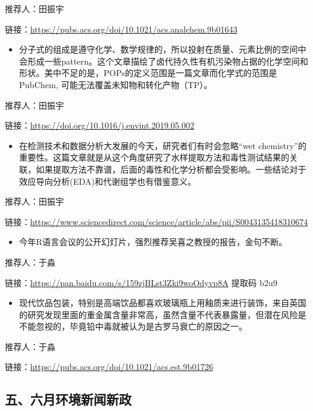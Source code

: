 \documentclass[
]{book}
\providecommand{\tightlist}{%
  \setlength{\itemsep}{0pt}\setlength{\parskip}{0pt}}
\begin{document}
推荐人：田振宇

链接：\url{https://pubs.acs.org/doi/10.1021/acs.analchem.9b01643}

\begin{itemize}
\tightlist
\item
  分子式的组成是遵守化学、数学规律的，所以投射在质量、元素比例的空间中会形成一些pattern。这个文章描绘了卤代持久性有机污染物占据的化学空间和形状。美中不足的是，POPs的定义范围是一篇文章而化学式的范围是PubChem, 可能无法覆盖未知物和转化产物（TP）。
\end{itemize}

推荐人：田振宇

链接：\url{https://doi.org/10.1016/j.envint.2019.05.002}

\begin{itemize}
\tightlist
\item
  在检测技术和数据分析大发展的今天，研究者们有时会忽略``wet chemistry''的重要性。这篇文章就是从这个角度研究了水样提取方法和毒性测试结果的关联，如果提取方法不靠谱，后面的毒性和化学分析都会受影响。一些结论对于效应导向分析(EDA)和代谢组学也有借鉴意义。
\end{itemize}

推荐人：田振宇

链接：\url{https://www.sciencedirect.com/science/article/abs/pii/S0043135418310674}

\begin{itemize}
\tightlist
\item
  今年R语言会议的公开幻灯片，强烈推荐吴喜之教授的报告，金句不断。
\end{itemize}

推荐人：于淼

链接：\url{https://pan.baidu.com/s/159zjBLst3Zki9woOdyvp8A} 提取码 b2u9

\begin{itemize}
\tightlist
\item
  现代饮品包装，特别是高端饮品都喜欢玻璃瓶上用釉质来进行装饰，来自英国的研究发现里面的重金属含量非常高，虽然含量不代表暴露量，但潜在风险是不能忽视的，毕竟铅中毒就被认为是古罗马衰亡的原因之一。
\end{itemize}

推荐人：于淼

链接：\url{https://pubs.acs.org/doi/10.1021/acs.est.9b01726}

\hypertarget{ux4e94ux516dux6708ux73afux5883ux65b0ux95fbux65b0ux653f}{%
\subsection*{五、六月环境新闻新政}\label{ux4e94ux516dux6708ux73afux5883ux65b0ux95fbux65b0ux653f}}
\end{document}
